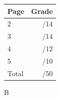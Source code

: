 \documentclass[12pt]{article}
\newcommand{\skipline}{\vspace{12pt}}
\begin{document}
\begin{table}[hbt]
\begin{center}
\begin{tabular}{|l|r|} \hline
Page&Grade\\
\hline \hline
\cline{1-2} 2 & \enspace\enspace\enspace\enspace\enspace\enspace/14\\
\cline{1-2} 3 & \enspace\enspace\enspace\enspace\enspace\enspace/14\\
\cline{1-2} 4 & \enspace\enspace\enspace\enspace\enspace\enspace/12\\
\cline{1-2} 5 & \enspace\enspace\enspace\enspace\enspace\enspace/10\\
\cline{1-2} Total & \enspace\enspace\enspace\enspace\enspace\enspace/50\\
\hline
\end{tabular}

\skipline

\skipline

\skipline

B
\end{center}
\end{table}
\newpage
\end{document}
